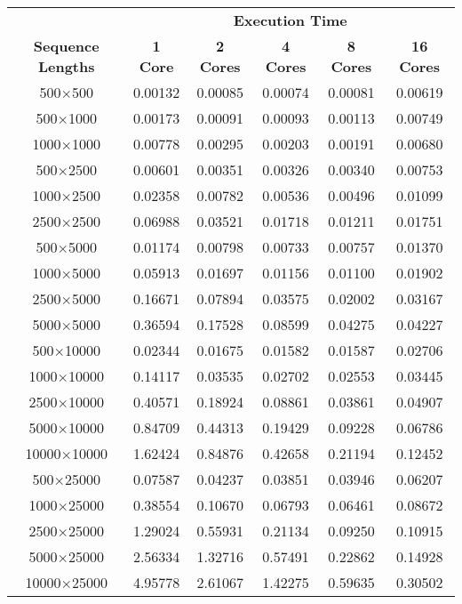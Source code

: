 \documentclass[usletter, 11pt]{extarticle}
\begin{document}
    \newpage
    \begin{longtable}{|c|c|c|c|c|c|}
    & \multicolumn{5}{c}{\textbf{Execution Time}} \\
    \textbf{Sequence Lengths} & \textbf{1 Core} & \textbf{2 Cores} & \textbf{4 Cores} & \textbf{8 Cores} & \textbf{16 Cores} \\
500$\times$500       & 0.00132 & 0.00085 & 0.00074 & 0.00081 & 0.00619 \\
500$\times$1000      & 0.00173 & 0.00091 & 0.00093 & 0.00113 & 0.00749 \\
1000$\times$1000     & 0.00778 & 0.00295 & 0.00203 & 0.00191 & 0.00680 \\
500$\times$2500      & 0.00601 & 0.00351 & 0.00326 & 0.00340 & 0.00753 \\
1000$\times$2500     & 0.02358 & 0.00782 & 0.00536 & 0.00496 & 0.01099 \\
2500$\times$2500     & 0.06988 & 0.03521 & 0.01718 & 0.01211 & 0.01751 \\
500$\times$5000      & 0.01174 & 0.00798 & 0.00733 & 0.00757 & 0.01370 \\
1000$\times$5000     & 0.05913 & 0.01697 & 0.01156 & 0.01100 & 0.01902 \\
2500$\times$5000     & 0.16671 & 0.07894 & 0.03575 & 0.02002 & 0.03167 \\
5000$\times$5000     & 0.36594 & 0.17528 & 0.08599 & 0.04275 & 0.04227 \\
500$\times$10000     & 0.02344 & 0.01675 & 0.01582 & 0.01587 & 0.02706 \\
1000$\times$10000    & 0.14117 & 0.03535 & 0.02702 & 0.02553 & 0.03445 \\
2500$\times$10000    & 0.40571 & 0.18924 & 0.08861 & 0.03861 & 0.04907 \\
5000$\times$10000    & 0.84709 & 0.44313 & 0.19429 & 0.09228 & 0.06786 \\
10000$\times$10000   & 1.62424 & 0.84876 & 0.42658 & 0.21194 & 0.12452 \\
500$\times$25000     & 0.07587 & 0.04237 & 0.03851 & 0.03946 & 0.06207 \\
1000$\times$25000    & 0.38554 & 0.10670 & 0.06793 & 0.06461 & 0.08672 \\
2500$\times$25000    & 1.29024 & 0.55931 & 0.21134 & 0.09250 & 0.10915 \\
5000$\times$25000    & 2.56334 & 1.32716 & 0.57491 & 0.22862 & 0.14928 \\
10000$\times$25000   & 4.95778 & 2.61067 & 1.42275 & 0.59635 & 0.30502 \\

\end{longtable}
\end{document}
